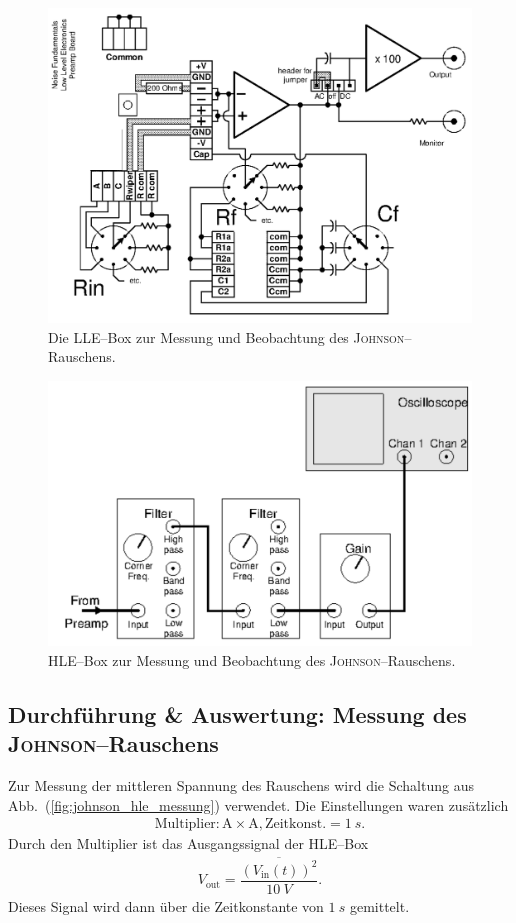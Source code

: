 \documentclass[sn-mathphys-num,iicol]{sn-jnl}
\theoremstyle{thmstyleone}
\theoremstyle{thmstyletwo}
\theoremstyle{thmstylethree}
\begin{document}
\begin{figure}[t]
        \centering
        \includegraphics[width=.5\textwidth]{425_schaltplan_johnson_LLE.png}
        \caption{Die LLE--Box zur Messung und Beobachtung des \textsc{Johnson}--Rauschens.\cite{anleitung425}} \label{fig:johnson_lle}
\end{figure}

\begin{figure}[t]
        \centering
        \includegraphics[width=.5\textwidth]{425_schaltplan_visualisierung_johnson_HLE.png}
        \caption{HLE--Box zur Messung und Beobachtung des \textsc{Johnson}--Rauschens.\cite{anleitung425}} \label{fig:johnson_hle}
\end{figure}

\subsection{Durchführung \& Auswertung: Messung des \textsc{Johnson}--Rauschens}
Zur Messung der mittleren Spannung des Rauschens wird die Schaltung aus Abb.\ (\ref{fig:johnson_hle_messung}) verwendet.
Die Einstellungen waren zusätzlich
\begin{align} 
        \text{Multiplier}:\text{A}\times \text{A},\text{Zeitkonst.}=\SI{1}{s}
.\end{align} 
Durch den Multiplier ist das Ausgangssignal der HLE--Box
\begin{align} 
        V_\text{out}=\dfrac{\overline{\left(V_\text{in}(t)\right)^2}}{\SI{10}{V}}
.\end{align} 
Dieses Signal wird dann über die Zeitkonstante von $\SI{1}{s}$ gemittelt.
\end{document}
